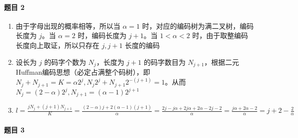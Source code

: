\documentclass{ctexart}
\begin{document}
\paragraph{题目 2}

\begin{enumerate}
    \item 由于字母出现的概率相等，所以当 $\alpha = 1$ 时，对应的编码树为满二叉树，编码长度为 $j$。当 $\alpha = 2$ 时，编码长度为 $j + 1$。当 $1 < \alpha < 2$ 时，由于取整编码长度向上取证，所以只存在 $j, j + 1$ 长度的编码
    \item 设长为 $j$ 的码字个数为 $N_j$，长度为 $j + 1$ 的码字数目为 $N_{j+1}$，根据二元 Huffman编码思想（必定占满整个码树），即 $N_j + N_{j+1} = K = \alpha2^j, N_j2^j + N_{j+1}2^{-(j+1)} = 1$。从而 $N_j = (2 - \alpha)2^j, N_{j+1} = (\alpha - 1)2^{j+1}$
    \item $l = \frac{jN_j + (j + 1)N_{j+1}}{K} = \frac{(2  -\alpha)j + 2(\alpha - 1)(j + 1)}{\alpha} = \frac{2j - j\alpha + 2j\alpha + 2\alpha - 2j - 2}{\alpha} = \frac{j\alpha + 2\alpha - 2}{\alpha} = j + 2 - \frac{2}{\alpha}$
\end{enumerate}

\paragraph{题目 3}
\end{document}
